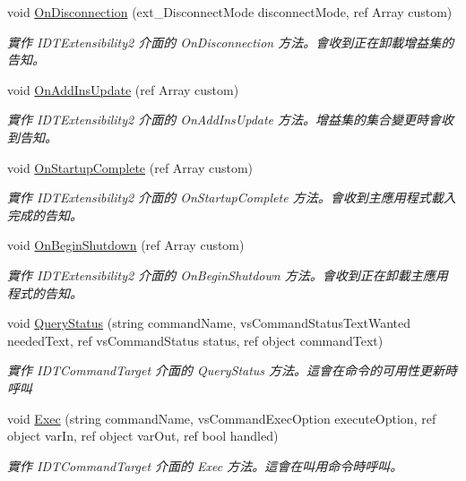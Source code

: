 \begin{DoxyCompactItemize}
\item 
void \hyperlink{class_thread_watcher_1_1_connect_a07071ffc336ed91957cafb8ee4438c79}{On\+Disconnection} (ext\+\_\+\+Disconnect\+Mode disconnect\+Mode, ref Array custom)
\begin{DoxyCompactList}\small\item\em 實作 I\+D\+T\+Extensibility2 介面的 On\+Disconnection 方法。會收到正在卸載增益集的告知。\end{DoxyCompactList}\item 
void \hyperlink{class_thread_watcher_1_1_connect_ac2b425c7f2bc531841c7f4b88b81e008}{On\+Add\+Ins\+Update} (ref Array custom)
\begin{DoxyCompactList}\small\item\em 實作 I\+D\+T\+Extensibility2 介面的 On\+Add\+Ins\+Update 方法。增益集的集合變更時會收到告知。\end{DoxyCompactList}\item 
void \hyperlink{class_thread_watcher_1_1_connect_aac2211c5c6e6201dfb187c58bfb36bdb}{On\+Startup\+Complete} (ref Array custom)
\begin{DoxyCompactList}\small\item\em 實作 I\+D\+T\+Extensibility2 介面的 On\+Startup\+Complete 方法。會收到主應用程式載入完成的告知。\end{DoxyCompactList}\item 
void \hyperlink{class_thread_watcher_1_1_connect_a88f39a0593bf62c9de2f422ce782188a}{On\+Begin\+Shutdown} (ref Array custom)
\begin{DoxyCompactList}\small\item\em 實作 I\+D\+T\+Extensibility2 介面的 On\+Begin\+Shutdown 方法。會收到正在卸載主應用程式的告知。\end{DoxyCompactList}\item 
void \hyperlink{class_thread_watcher_1_1_connect_a0f13daddeb1fced04dc4d13e0c00b2c6}{Query\+Status} (string command\+Name, vs\+Command\+Status\+Text\+Wanted needed\+Text, ref vs\+Command\+Status status, ref object command\+Text)
\begin{DoxyCompactList}\small\item\em 實作 I\+D\+T\+Command\+Target 介面的 Query\+Status 方法。這會在命令的可用性更新時呼叫\end{DoxyCompactList}\item 
void \hyperlink{class_thread_watcher_1_1_connect_a65dea176c7c65eb89d39f46f506c271b}{Exec} (string command\+Name, vs\+Command\+Exec\+Option execute\+Option, ref object var\+In, ref object var\+Out, ref bool handled)
\begin{DoxyCompactList}\small\item\em 實作 I\+D\+T\+Command\+Target 介面的 Exec 方法。這會在叫用命令時呼叫。\end{DoxyCompactList}\end{DoxyCompactItemize}
